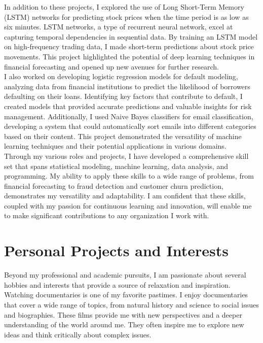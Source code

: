 \documentclass[12pt,a4paper,sans,english]{report}
\begin{document}
\noindent In addition to these projects, I explored the use of Long Short-Term Memory (LSTM) networks for predicting stock prices when the time period is as low as six minutes. LSTM networks, a type of recurrent neural network, excel at capturing temporal dependencies in sequential data. By training an LSTM model on high-frequency trading data, I made short-term predictions about stock price movements. This project highlighted the potential of deep learning techniques in financial forecasting and opened up new avenues for further research.\\

\noindent I also worked on developing logistic regression models for default modeling, analyzing data from financial institutions to predict the likelihood of borrowers defaulting on their loans. Identifying key factors that contribute to default, I created models that provided accurate predictions and valuable insights for risk management. Additionally, I used Naive Bayes classifiers for email classification, developing a system that could automatically sort emails into different categories based on their content. This project demonstrated the versatility of machine learning techniques and their potential applications in various domains.\\

\noindent Through my various roles and projects, I have developed a comprehensive skill set that spans statistical modeling, machine learning, data analysis, and programming. My ability to apply these skills to a wide range of problems, from financial forecasting to fraud detection and customer churn prediction, demonstrates my versatility and adaptability. I am confident that these skills, coupled with my passion for continuous learning and innovation, will enable me to make significant contributions to any organization I work with.

\chapter{Personal Projects and Interests}

\noindent Beyond my professional and academic pursuits, I am passionate about several hobbies and interests that provide a source of relaxation and inspiration. Watching documentaries is one of my favorite pastimes. I enjoy documentaries that cover a wide range of topics, from natural history and science to social issues and biographies. These films provide me with new perspectives and a deeper understanding of the world around me. They often inspire me to explore new ideas and think critically about complex issues.\\
\end{document}
